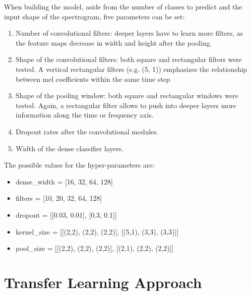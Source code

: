 When building the model, aside from the number of classes to predict and the
input shape of the spectrogram, five parameters can be set:

\begin{enumerate}
    \item Number of convolutional filters: deeper layers have to learn more
        filters, as the feature maps decrease in width and height after the
        pooling.
    \item Shape of the convolutional filters:
        both square and rectangular filters were tested.
        A vertical rectangular filters (e.g. (5, 1)) emphasizes the
        relationship between mel coefficients within the same time step
    \item Shape of the pooling window: 
        both square and rectangular windows were tested.
        Again, a rectangular filter allows to push into deeper layers more
        information along the time or frequency axis.
    \item Dropout rates after the convolutional modules.
    \item Width of the dense classifier layers.
\end{enumerate}
The possible values for the hyper-parameters are:
\begin{itemize}
    \item dense\_width = [16, 32, 64, 128]
    \item filters = [10, 20, 32, 64, 128]
    \item dropout = [[0.03, 0.01],  [0.3, 0.1]]
    \item kernel\_size = [[(2,2), (2,2), (2,2)], [(5,1), (3,3), (3,3)]]
    \item pool\_size = [[(2,2), (2,2), (2,2)], [(2,1), (2,2), (2,2)]]
\end{itemize}




\section{Transfer Learning Approach}
\label{sec:transfer_learning}

